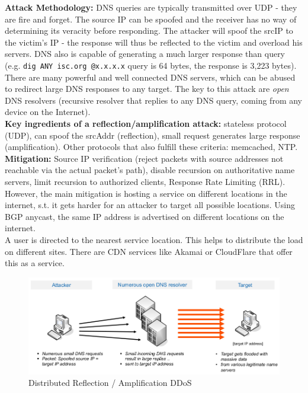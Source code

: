 \documentclass[11pt,oneside,a4paper]{article}
\begin{document}
\textbf{Attack Methodology:} DNS queries are typically transmitted over UDP - they are fire and forget. The source IP can be spoofed and the receiver has no way of determining its veracity before responding. The attacker will spoof the srcIP to the victim's IP - the response will thus be reflected to the victim and overload his servers. DNS also is capable of generating a much larger response than query (e.g. \texttt{dig ANY isc.org @x.x.x.x} query is 64 bytes, the response is 3,223 bytes). There are many powerful and well connected DNS servers, which can be abused to redirect large DNS responses to any target. The key to this attack are \textit{open} DNS resolvers (recursive resolver that replies to any DNS query, coming from any device
on the Internet).\\
\textbf{Key ingredients of a reflection/amplification attack:} stateless protocol (UDP), can spoof the srcAddr (reflection), small request generates large response (amplification). Other protocols that also fulfill these criteria: memcached, NTP.\\
\textbf{Mitigation:} Source IP verification (reject packets with source addresses not reachable via the actual packet’s path), disable recursion on authoritative name servers, limit recursion to authorized clients, Response Rate Limiting (RRL).\\
However, the main mitigation is hosting a service on different locations in the internet, s.t. it gets harder for an attacker to target all possible locations. Using BGP anycast, the same IP address is advertised on different locations on the internet.\\
A user is directed to the nearest service location. This helps to distribute the load on different sites. There are CDN services like Akamai or CloudFlare that offer this as a service.

\begin{figure}[hb]
	\centering
	\includegraphics[width=0.7\linewidth]{figures/dns_reflection_amplification_ddos}
	\caption{Distributed Reflection / Amplification DDoS}
	\label{fig:dnsreflectionamplificationddos}
\end{figure}
\end{document}
